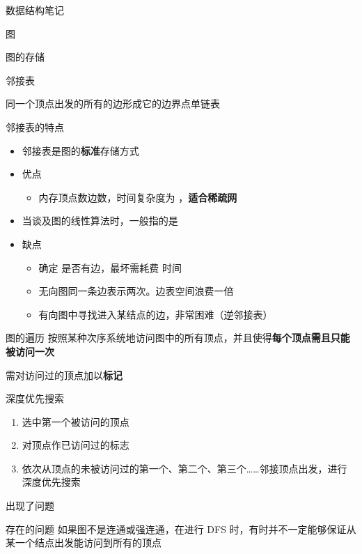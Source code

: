 \documentclass[
  ignorenonframetext,
]{beamer}
\providecommand{\tightlist}{%
  \setlength{\itemsep}{0pt}\setlength{\parskip}{0pt}}
\begin{document}
\begin{frame}[fragile]{数据结构笔记}
\begin{block}{图}
\begin{block}{图的存储}
\begin{block}{邻接表}
\begin{itemize}
  同一个顶点出发的所有的边形成它的边界点单链表
\end{itemize}

\end{block}

\begin{block}{邻接表的特点}
\protect{}\label{ux90bbux63a5ux8868ux7684ux7279ux70b9}
\begin{itemize}
\tightlist
\item
  邻接表是图的\textbf{标准}存储方式
\item
  优点

  \begin{itemize}
  \tightlist
  \item
    {内存顶点数边数}，时间复杂度为 {}，\textbf{适合稀疏网}
  \end{itemize}
\item
  当谈及图的线性算法时，一般指的是 {}
\item
  缺点

  \begin{itemize}
  \tightlist
  \item
    确定 {} 是否有边，最坏需耗费 {} 时间
  \item
    无向图同一条边表示两次。边表空间浪费一倍
  \item
    有向图中寻找进入某结点的边，非常困难（逆邻接表）
  \end{itemize}
\end{itemize}
\end{block}
\end{block}

\begin{block}{图的遍历}
\protect{}\label{ux56feux7684ux904dux5386}
按照某种次序系统地访问图中的所有顶点，并且使得\textbf{每个顶点需且只能被访问一次}

需对访问过的顶点加以\textbf{标记}

\begin{block}{深度优先搜索}
\protect{}\label{ux6df1ux5ea6ux4f18ux5148ux641cux7d22}
\begin{enumerate}
\tightlist
\item
  选中第一个被访问的顶点
\item
  对顶点作已访问过的标志
\item
  依次从顶点的未被访问过的第一个、第二个、第三个\ldots\ldots 邻接顶点出发，进行深度优先搜索
\end{enumerate}

出现了问题

\begin{block}{存在的问题}
\protect{}\label{ux5b58ux5728ux7684ux95eeux9898}
\protect{}\label{DFSdamn}{如果图不是连通或强连通，在进行
DFS 时，有时并不一定能够保证从某一个结点出发能访问到所有的顶点}
\end{block}


\end{block}
\end{block}
\end{block}
\end{frame}
\end{document}
